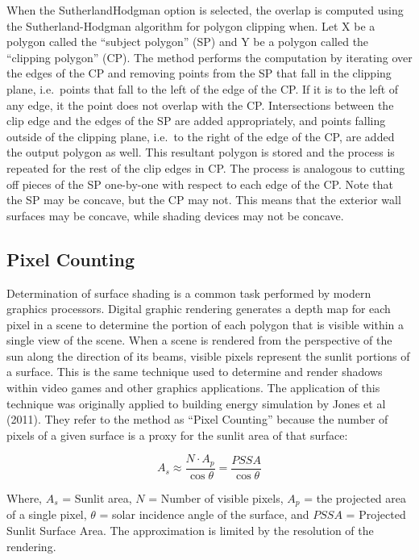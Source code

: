 When the SutherlandHodgman option is selected, the overlap is computed using the Sutherland-Hodgman algorithm for polygon clipping when. Let X be a polygon called the ``subject polygon'' (SP) and Y be a polygon called the ``clipping polygon'' (CP). The method performs the computation by iterating over the edges of the CP and removing points from the SP that fall in the clipping plane, i.e.~points that fall to the left of the edge of the CP. If it is to the left of any edge, it the point does not overlap with the CP. Intersections between the clip edge and the edges of the SP are added appropriately, and points falling outside of the clipping plane, i.e.~to the right of the edge of the CP, are added the output polygon as well. This resultant polygon is stored and the process is repeated for the rest of the clip edges in CP. The process is analogous to cutting off pieces of the SP one-by-one with respect to each edge of the CP. Note that the SP may be concave, but the CP may not. This means that the exterior wall surfaces may be concave, while shading devices may not be concave.

\subsection{Pixel Counting}

Determination of surface shading is a common task performed by modern graphics processors. Digital graphic rendering generates a depth map for each pixel in a scene to determine the portion of each polygon that is visible within a single view of the scene. When a scene is rendered from the perspective of the sun along the direction of its beams, visible pixels represent the sunlit portions of a surface. This is the same technique used to determine and render shadows within video games and other graphics applications. The application of this technique was originally applied to building energy simulation by Jones et al (2011). They refer to the method as ``Pixel Counting'' because the number of pixels of a given surface is a proxy for the sunlit area of that surface:

\begin{equation}
A_s \approx \frac{N \cdot A_p}{\cos{\theta}} = \frac{PSSA}{\cos{\theta}}
\end{equation}

Where, $A_s$ = Sunlit area, $N$ = Number of visible pixels, $A_p$ = the projected area of a single pixel, $\theta$ = solar incidence angle of the surface, and $PSSA$ = Projected Sunlit Surface Area. The approximation is limited by the resolution of the rendering.

